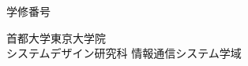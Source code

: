 \newpage
\thispagestyle{empty}
{\raggedleft
  \normalsize 学修番号 \studentnumber \\
}
\vspace*{9truemm}
\begin{center}
 \Large\bf\jdoctitle
\end{center}
\vspace*{27truemm}
\begin{center}
 \Large\bf\jtitle
\end{center}
\vspace*{18truemm}
\begin{center}
 \Large\jauthor
\end{center}
\vspace*{50truemm}
\begin{center}
 \jdate
\end{center}
\vspace*{4.5truemm}
\begin{center}
 首都大学東京大学院 \\
 システムデザイン研究科 情報通信システム学域
\end{center}
\vspace*{\fill}

